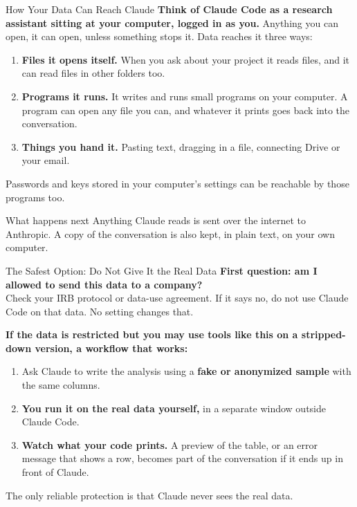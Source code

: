 \documentclass[aspectratio=169, 11pt]{beamer}
\begin{document}
\begin{frame}{How Your Data Can Reach Claude}
  \textbf{Think of Claude Code as a research assistant sitting at your computer, logged in as you.} Anything you can open, it can open, unless something stops it. Data reaches it three ways:

  \vspace{0.5em}
  \begin{enumerate}
    \item \textbf{Files it opens itself.} When you ask about your project it reads files, and it can read files in other folders too.
    \item \textbf{Programs it runs.} It writes and runs small programs on your computer. A program can open any file you can, and whatever it prints goes back into the conversation.
    \item \textbf{Things you hand it.} Pasting text, dragging in a file, connecting Drive or your email.
  \end{enumerate}

  \vspace{0.3em}
  {\small Passwords and keys stored in your computer's settings can be reachable by those programs too.}

  \vspace{0.4em}
  \begin{alertblock}{What happens next}
    Anything Claude reads is sent over the internet to Anthropic. A copy of the conversation is also kept, in plain text, on your own computer.
  \end{alertblock}
\end{frame}

\begin{frame}{The Safest Option: Do Not Give It the Real Data}
  \textbf{First question: am I allowed to send this data to a company?}\\
  Check your IRB protocol or data-use agreement. If it says no, do not use Claude Code on that data. No setting changes that.

  \vspace{0.6em}
  \textbf{If the data is restricted but you may use tools like this on a stripped-down version, a workflow that works:}
  \begin{enumerate}
    \item Ask Claude to write the analysis using a \textbf{fake or anonymized sample} with the same columns.
    \item \textbf{You run it on the real data yourself,} in a separate window outside Claude Code.
    \item \textbf{Watch what your code prints.} A preview of the table, or an error message that shows a row, becomes part of the conversation if it ends up in front of Claude.
  \end{enumerate}

  \vspace{0.5em}
  \alert{The only reliable protection is that Claude never sees the real data.}
\end{frame}
\end{document}

